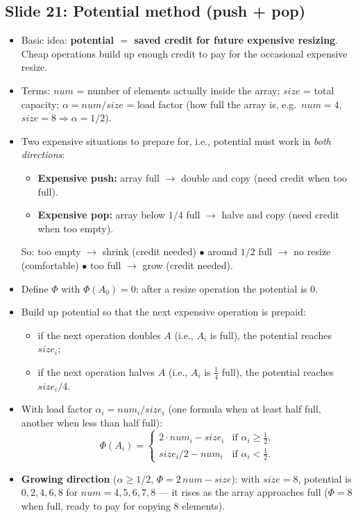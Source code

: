 \documentclass[11pt]{article}
\newcommand{\slide}[2]{\subsection*{Slide #1: #2}}
\begin{document}
\slide{21}{Potential method (push + pop)}
\begin{itemize}
  \item Basic idea: \textbf{potential $=$ saved credit for future expensive resizing}. Cheap operations build up enough credit to pay for the occasional expensive resize.
  \item Terms: $num$ = number of elements actually inside the array; $size$ = total capacity; $\alpha = num/size$ = load factor (how full the array is, e.g.\ $num = 4$, $size = 8 \Rightarrow \alpha = 1/2$).
  \item Two expensive situations to prepare for, i.e., potential must work in \emph{both directions}:
  \begin{itemize}
    \item \textbf{Expensive push:} array full $\to$ double and copy (need credit when too full).
    \item \textbf{Expensive pop:} array below $1/4$ full $\to$ halve and copy (need credit when too empty).
  \end{itemize}
  \noindent So: too empty $\to$ shrink (credit needed) \quad $\bullet$ \quad around $1/2$ full $\to$ no resize (comfortable) \quad $\bullet$ \quad too full $\to$ grow (credit needed).
  \item Define $\Phi$ with $\Phi(A_0) = 0$; after a resize operation the potential is $0$.
  \item Build up potential so that the next expensive operation is prepaid:
  \begin{itemize}
    \item if the next operation doubles $A$ (i.e., $A_i$ is full), the potential reaches $size_i$;
    \item if the next operation halves $A$ (i.e., $A_i$ is $\tfrac{1}{4}$ full), the potential reaches $size_i/4$.
  \end{itemize}
  \item With load factor $\alpha_i = num_i / size_i$ (one formula when at least half full, another when less than half full):
        \[
          \Phi(A_i) =
          \begin{cases}
            2 \cdot num_i - size_i & \text{if } \alpha_i \ge \tfrac{1}{2},\\[0.5ex]
            size_i/2 - num_i & \text{if } \alpha_i < \tfrac{1}{2}.
          \end{cases}
        \]
  \item \textbf{Growing direction} ($\alpha \ge 1/2$, $\Phi = 2\,num - size$): with $size = 8$, potential is $0, 2, 4, 6, 8$ for $num = 4, 5, 6, 7, 8$ --- it rises as the array approaches full ($\Phi = 8$ when full, ready to pay for copying 8 elements).

\end{itemize}
\end{document}
